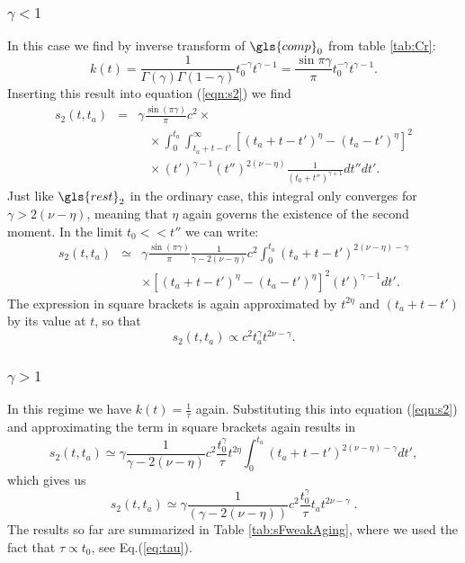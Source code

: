\subsubsection{$\gamma<1$}
In this case we find by inverse transform of $\gls{comp}_0$ from table \ref{tab:Cr}:
\begin{equation}
 k(t) = \frac{1}{\Gamma(\gamma) \Gamma(1-\gamma)} t_0^{-\gamma} t^{\gamma-1} = \frac{\sin \pi \gamma}{\pi} t_0^{-\gamma} t^{\gamma-1}. \label{eqn:kGammaSmall}
\end{equation}
Inserting this result into equation (\ref{eqn:s2}) we find
\begin{eqnarray}
s_2(t,t_a) &=& \gamma\frac{\sin(\pi \gamma)}{\pi}  c^2 \times \\
&& \;\;\; \times \int_0^{t_a} \int^{\infty}_{t_a+t-t'} [(t_a+t-t')^\eta-(t_a-t')^{\eta}]^2 \nonumber\\
&& \;\;\; \times   (t')^{\gamma-1}  (t'')^{2(\nu-\eta)} \frac{1}{(t_0+t'')^{\gamma+1}} dt'' dt' . \nonumber
\end{eqnarray}
Just like $\gls{rest}_2$ in the ordinary case, this integral only converges for $\gamma>2(\nu-\eta)$, meaning that $\eta$ again governs the existence of the second moment. In the limit $t_0<< t''$ we can write:
\begin{eqnarray}
s_2(t,t_a) &\simeq&  \gamma\frac{\sin(\pi \gamma)}{\pi} \frac{ 1 }{\gamma-2(\nu-\eta)} c^2 \int_0^{t_a} (t_a+t-t')^{2(\nu-\eta)-\gamma}   \nonumber \\
&& \times [(t_a+t-t')^\eta-(t_a-t')^{\eta}]^2 (t')^{\gamma-1}  dt' .
\end{eqnarray}
The expression in square brackets is again approximated by $t^{2\eta}$ and $(t_a+t-t')$ by its value at $t$, so that
\begin{equation}
 s_2(t,t_a) \propto c^2 t_a^\gamma t^{2\nu -\gamma}. 
\end{equation}

\subsubsection{$\gamma>1$}
In this regime we have $k(t)=\frac{1}{\tau}$ again. Substituting this into equation (\ref{eqn:s2}) and  approximating the term in square brackets again results in
\begin{equation}
s_2(t,t_a) \simeq \gamma \frac{1}{\gamma-2(\nu-\eta)}c^2 \frac{t_0^{\gamma}}{\tau} t^{2\eta} \int_{0}^{t_a} (t_a+t-t')^{2(\nu-\eta)-\gamma} dt'  ,
\end{equation}
which gives us
\begin{equation}
s_2(t,t_a) \simeq \gamma \frac{1}{(\gamma-2(\nu-\eta))} c^2\frac{t_0^{\gamma}}{\tau} t_a t^{2\nu-\gamma} \; .
\end{equation}
The results so far are summarized in Table \ref{tab:sFweakAging}, where we used the fact that $\tau \propto t_0$, see Eq.(\ref{eq:tau}). 


